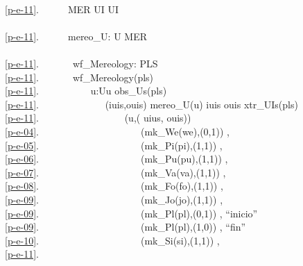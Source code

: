 \bp
\>\ \\
\ref{p-e-11}.\ \ \ \ \ \ MER {\EQ} UI {\TIMES} UI\\
\>\ \\
\ref{p-e-11}.\ \ \ \ \ \ mereo\_U: U {\RIGHTARROW} MER \\
\>\ \\
\ref{p-e-11}.\ \ \ \ \ \ \ wf\_Mereology: PLS {\RIGHTARROW}  \label{pipe:wfMereology}\\
\ref{p-e-11}.\ \ \ \ \ \ \ wf\_Mereology(pls) {\IS}\\
\ref{p-e-11}.\ \ \ \ \ \ \ \ \ \ {\ALL} u:U{\RDOT}u {\ISIN} obs\_Us(pls){\DBLRIGHTARROW} \\
\ref{p-e-11}.\ \ \ \ \ \ \ \ \ \ \ \ \  (iuis,ouis) {\EQ} mereo\_U(u)  iuis {\UNION} ouis {\SUBSETEQ} xtr\_UIs(pls) {\WEDGE}\\
\ref{p-e-11}.\ \ \ \ \ \ \ \ \ \ \ \ \ \ \ \ \  (u,( uius, ouis)) \\
\ref{p-e-04}.\ \ \ \ \ \ \ \ \ \ \ \ \ \ \ \ \ \ \ \ \ (mk\_We(we),(0,1)) {\RIGHTARROW} ,\\
\ref{p-e-05}.\ \ \ \ \ \ \ \ \ \ \ \ \ \ \ \ \ \ \ \ \ (mk\_Pi(pi),(1,1)) {\RIGHTARROW} ,\\
\ref{p-e-06}.\ \ \ \ \ \ \ \ \ \ \ \ \ \ \ \ \ \ \ \ \ (mk\_Pu(pu),(1,1)) {\RIGHTARROW} ,\\
\ref{p-e-07}.\ \ \ \ \ \ \ \ \ \ \ \ \ \ \ \ \ \ \ \ \ (mk\_Va(va),(1,1)) {\RIGHTARROW} ,\\
\ref{p-e-08}.\ \ \ \ \ \ \ \ \ \ \ \ \ \ \ \ \ \ \ \ \ (mk\_Fo(fo),(1,1)) {\RIGHTARROW} ,\\
\ref{p-e-09}.\ \ \ \ \ \ \ \ \ \ \ \ \ \ \ \ \ \ \ \ \ (mk\_Jo(jo),(1,1)) {\RIGHTARROW} ,\\
\ref{p-e-09}.\ \ \ \ \ \ \ \ \ \ \ \ \ \ \ \ \ \ \ \ \ (mk\_Pl(pl),(0,1)) {\RIGHTARROW} , ``inicio''\\
\ref{p-e-09}.\ \ \ \ \ \ \ \ \ \ \ \ \ \ \ \ \ \ \ \ \ (mk\_Pl(pl),(1,0)) {\RIGHTARROW} , ``fin''\\
\ref{p-e-10}.\ \ \ \ \ \ \ \ \ \ \ \ \ \ \ \ \ \ \ \ \ (mk\_Si(si),(1,1)) {\RIGHTARROW} ,\\
\ref{p-e-11}.\ \ \ \ \ \ \ \ \ \ \ \ \ \ \ \ \ \ \ \ \ {\UNDERLINE} {\RIGHTARROW}   
\ep


